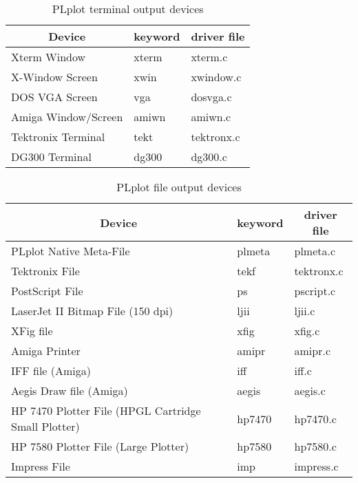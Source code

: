 \renewcommand{\arraystretch}{1.5}
\begin{table}[tb]
  \centering
  \begin{tabular}{|l|l|l|}  \hline
    \multicolumn{1}{|c}{Device} 
      & \multicolumn{1}{|c|}{keyword}
        & \multicolumn{1}{|c|}{driver file}
\\ \hline
	Xterm Window
	  & xterm
	    & xterm.c
\\ \hline
	X-Window Screen
	  & xwin
	    & xwindow.c
\\ \hline
	DOS VGA Screen
	  & vga
	    & dosvga.c
\\ \hline
	Amiga Window/Screen
	  & amiwn
	    & amiwn.c
\\ \hline
	Tektronix Terminal
	  & tekt
	    & tektronx.c
\\ \hline
	DG300 Terminal
	  & dg300
	    & dg300.c
\\ \hline
    \end{tabular}
  \caption{PLplot terminal output devices}
  \label{tab:dev1}
\end{table}

\begin{table}[tb]
  \centering
  \begin{tabular}{|l|l|l|}  \hline
    \multicolumn{1}{|c}{Device} 
      & \multicolumn{1}{|c|}{keyword}
        & \multicolumn{1}{|c|}{driver file}
\\ \hline
	PLplot Native Meta-File
	  & plmeta
	    & plmeta.c
\\ \hline
	Tektronix File
	  & tekf
	    & tektronx.c
\\ \hline
	PostScript File
	  & ps
	    & pscript.c
\\ \hline
	LaserJet II Bitmap File (150 dpi)
	  & ljii
	    & ljii.c
\\ \hline
	XFig file
	  & xfig
	    & xfig.c
\\ \hline
	Amiga Printer
	  & amipr
	    & amipr.c
\\ \hline
	IFF file (Amiga)
	  & iff
	    & iff.c
\\ \hline
	Aegis Draw file (Amiga)
	  & aegis
	    & aegis.c
\\ \hline
	HP 7470 Plotter File (HPGL Cartridge Small Plotter)
	  & hp7470
	    & hp7470.c
\\ \hline
	HP 7580 Plotter File (Large Plotter)
	  & hp7580
	    & hp7580.c
\\ \hline
	Impress File
	  & imp
	    & impress.c
\\ \hline
    \end{tabular}
  \caption{PLplot file output devices}
  \label{tab:dev2}
\end{table}
\renewcommand{\arraystretch}{1.0}

